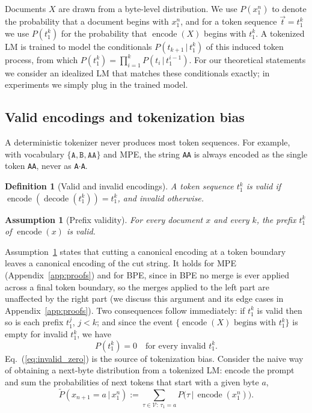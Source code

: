 \documentclass{article} %
\newtheorem{definition}{Definition}
\newtheorem{assumption}{Assumption}
\newcommand{\encf}{\operatorname{encode}}
\newcommand{\decf}{\operatorname{decode}}
\newcommand{\Vocab}{\mathcal{V}}
\newcommand{\str}[1]{\texttt{#1}}
\begin{document}
Documents $X$ are drawn from a byte-level distribution. We use $P(x_1^n)$ to denote the probability that a document begins with $x_1^n$, and for a token sequence $\vec{t}=t_1^k$ we use $P(t_1^k)$ for the probability that $\encf(X)$ begins with $t_1^k$. A tokenized LM is trained to model the conditionals $P(t_{k+1}\,|\,t_1^k)$ of this induced token process, from which $P(t_1^k)=\prod_{i=1}^{k} P(t_i\,|\,t_1^{i-1})$. For our theoretical statements we consider an idealized LM that matches these conditionals exactly; in experiments we simply plug in the trained model.

\subsection{Valid encodings and tokenization bias}
\label{sec:method_bias}
A deterministic tokenizer never produces most token sequences. For example, with vocabulary $\{\str{A},\str{B},\str{AA}\}$ and MPE, the string \str{AA} is always encoded as the single token \str{AA}, never as \str{A}$\cdot$\str{A}.

\begin{definition}[Valid and invalid encodings]
\label{def:valid}
A token sequence $t_1^k$ is \emph{valid} if $\encf(\decf(t_1^k)) = t_1^k$, and \emph{invalid} otherwise.
\end{definition}

\begin{assumption}[Prefix validity]
\label{ass:prefix}
For every document $x$ and every $k$, the prefix $t_1^k$ of $\encf(x)$ is valid.
\end{assumption}

Assumption~\ref{ass:prefix} states that cutting a canonical encoding at a token boundary leaves a canonical encoding of the cut string. It holds for MPE (Appendix~\ref{app:proofs}) and for BPE, since in BPE no merge is ever applied across a final token boundary, so the merges applied to the left part are unaffected by the right part (we discuss this argument and its edge cases in Appendix~\ref{app:proofs}). Two consequences follow immediately: if $t_1^k$ is valid then so is each prefix $t_1^{j}$, $j<k$; and since the event $\{\encf(X) \text{ begins with } t_1^k\}$ is empty for invalid $t_1^k$, we have
\begin{equation}
P(t_1^k) = 0 \quad \text{for every invalid } t_1^k. \label{eq:invalid_zero}
\end{equation}
Eq.~(\ref{eq:invalid_zero}) is the source of tokenization bias. Consider the naive way of obtaining a next-byte distribution from a tokenized LM: encode the prompt and sum the probabilities of next tokens that start with a given byte $a$,
\begin{equation}
\tilde{P}(x_{n+1}=a \,|\, x_1^n) := \sum_{\tau \in \Vocab:\, \tau_1 = a} P\big(\tau \,\big|\, \encf(x_1^n)\big). \label{eq:naive}
\end{equation}
\end{document}

